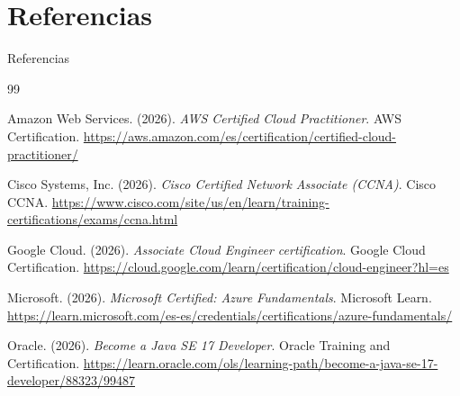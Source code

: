 \documentclass[aspectratio=169,10pt]{beamer}
\begin{document}

\section{Referencias}

\begin{frame}[allowframebreaks]{Referencias}

\begin{thebibliography}{99}

Amazon Web Services. (2026).
\textit{AWS Certified Cloud Practitioner}.
AWS Certification.
\url{https://aws.amazon.com/es/certification/certified-cloud-practitioner/}

\vspace{0.3cm}

Cisco Systems, Inc. (2026).
\textit{Cisco Certified Network Associate (CCNA)}.
Cisco CCNA.
\url{https://www.cisco.com/site/us/en/learn/training-certifications/exams/ccna.html}

\vspace{0.3cm}

Google Cloud. (2026).
\textit{Associate Cloud Engineer certification}.
Google Cloud Certification.
\url{https://cloud.google.com/learn/certification/cloud-engineer?hl=es}

\vspace{0.3cm}

Microsoft. (2026).
\textit{Microsoft Certified: Azure Fundamentals}.
Microsoft Learn.
\url{https://learn.microsoft.com/es-es/credentials/certifications/azure-fundamentals/}

\vspace{0.3cm}

Oracle. (2026).
\textit{Become a Java SE 17 Developer}.
Oracle Training and Certification.
\url{https://learn.oracle.com/ols/learning-path/become-a-java-se-17-developer/88323/99487}

\end{thebibliography}

\end{frame}
\end{document}
